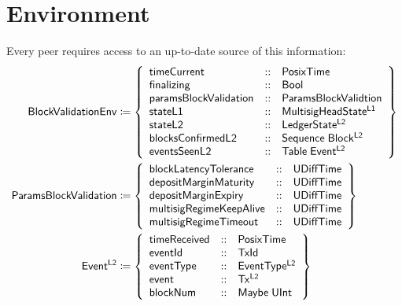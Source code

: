 \documentclass[../hydrozoa.tex]{subfiles}
\begin{document}
\section{Environment}%
\label{h:l2-block-environment}%

Every peer requires access to an up-to-date source of this information:
\begin{equation*}
\begin{split}
  \mathsf{BlockValidationEnv} &\coloneq \left\{
    \begin{array}{lll}
      \mathsf{timeCurrent} &::& \mathsf{PosixTime} \\
      \mathsf{finalizing} &::& \mathsf{Bool} \\
      \mathsf{paramsBlockValidation} &::& \mathsf{ParamsBlockValidtion} \\
      \mathsf{stateL1} &::& \mathsf{MultisigHeadState^{L1}} \\
      \mathsf{stateL2} &::& \mathsf{LedgerState^{L2}} \\
      \mathsf{blocksConfirmedL2} &::& \mathsf{Sequence} \; \mathsf{Block^{L2}} \\
      \mathsf{eventsSeenL2} &::& \mathsf{Table} \; \mathsf{Event^{L2}}
    \end{array}\right\} \\
  \mathsf{ParamsBlockValidation} &\coloneq \left\{
    \begin{array}{lll}
      \mathsf{blockLatencyTolerance} &::& \mathsf{UDiffTime} \\
      \mathsf{depositMarginMaturity} &::& \mathsf{UDiffTime} \\
      \mathsf{depositMarginExpiry} &::& \mathsf{UDiffTime} \\
      \mathsf{multisigRegimeKeepAlive} &::& \mathsf{UDiffTime} \\
      \mathsf{multisigRegimeTimeout} &::& \mathsf{UDiffTime}
    \end{array}\right\} \\
  \mathsf{Event^{L2}} &\coloneq \left\{
    \begin{array}{lll}
      \mathsf{timeReceived} &::& \mathsf{PosixTime} \\
      \mathsf{eventId} &::& \mathsf{TxId} \\
      \mathsf{eventType} &::& \mathsf{EventType^{L2}} \\
      \mathsf{event} &::& \mathsf{Tx^{L2}} \\
      \mathsf{blockNum} &::& \mathsf{Maybe} \; \mathsf{UInt}
    \end{array}\right\} \\
\end{split}
\end{equation*}
\end{document}
